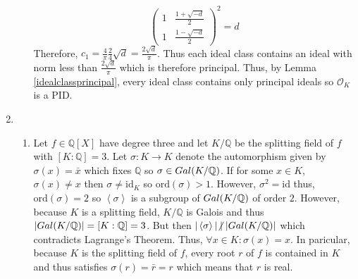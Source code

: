 \documentclass[12pt]{extarticle}
\newcommand{\ndivides}{\centernot \mid}
\newcommand{\Q}{\mathbb{Q}}
\newcommand{\ord}[1]{\mathrm{ord}\! \left(#1 \right)}
\newcommand{\galgroup}[1]{Gal \small(#1 \small)}
\newcommand{\ints}[1]{\mathcal{O}_{#1}}
\begin{document}
\begin{enumerate}
\begin{enumerate}
\[{\begin{pmatrix}
1 & \frac{1 + \sqrt{-d}}{2} \\
1 & \frac{1 - \sqrt{-d}}{2}
\end{pmatrix}}^2 = d
\]
Therefore, $c_1 = \frac{4}{\pi} \frac{2}{4} \sqrt{d} = \frac{2 \sqrt{d}}{\pi}$. Thus each ideal class contains an ideal with norm less than $\frac{2 \sqrt{d}}{\pi}$ which is therefore principal. Thus, by Lemma \ref{idealclassprincipal}, every ideal class contains only principal ideals so $\ints{K}$ is a PID.  

\end{enumerate}

\item

\begin{enumerate}
\item Let $f \in \Q[X]$ have degree three and let $K/\Q$ be the splitting field of $f$ with $[K : \Q] = 3$. Let $\sigma : K \rightarrow K$ denote the automorphism given by $\sigma(x) = \bar{x}$ which fixes $\Q$ so $\sigma \in \galgroup{K/\Q}$. If for some $x \in K$, $\sigma(x) \neq x$ then $\sigma \neq \mathrm{id}_K$ so $\ord{\sigma} > 1$. However, $\sigma^2 = \mathrm{id}$ thus, $\ord{\sigma} = 2$ so $\left< \sigma \right>$ is a subgroup of $\galgroup{K/\Q}$ of order $2$. However, because $K$ is a splitting field, $K/\Q$ is Galois and thus $|\galgroup{K/\Q}| = [K : \Q] = 3$. But then $|\left< \sigma \right> | \ndivides |\galgroup{K/\Q}|$ which contradicts Lagrange's Theorem. Thus, $\forall x \in K : \sigma(x) = x$. In paricular, because $K$ is the splitting field of $f$, every root $r$ of $f$ is contained in $K$ and thus satisfies $\sigma(r) = \bar{r} = r$ which means that $r$ is real.    


\end{enumerate}
\end{enumerate}
\end{document}
